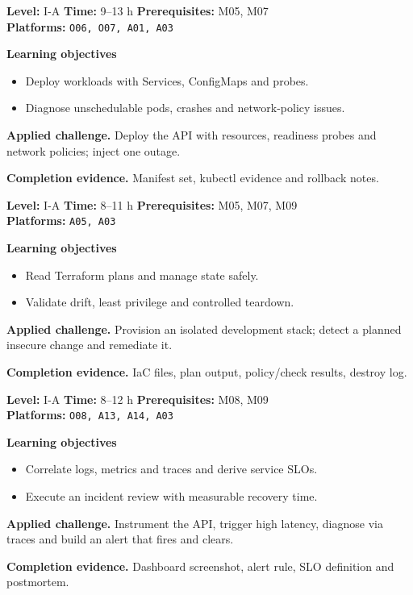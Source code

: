 \documentclass[10pt,letterpaper,oneside]{article}
\begin{document}
\vspace{2.5pt}
\begin{skillbox}[title={M09 \quad Kubernetes deployment and troubleshooting}]
\textbf{Level:} I-A \quad \textbf{Time:} 9--13 h \quad \textbf{Prerequisites:} M05, M07\\
\textbf{Platforms:} \texttt{O06, O07, A01, A03}\par
\textbf{Learning objectives}
\begin{itemize}
\item Deploy workloads with Services, ConfigMaps and probes.
\item Diagnose unschedulable pods, crashes and network-policy issues.
\end{itemize}
\textbf{Applied challenge.} Deploy the API with resources, readiness probes and network policies; inject one outage.\par
\textbf{Completion evidence.} Manifest set, kubectl evidence and rollback notes.\par
\end{skillbox}
\vspace{2.5pt}
\begin{skillbox}[title={M10 \quad Infrastructure as Code and cloud controls}]
\textbf{Level:} I-A \quad \textbf{Time:} 8--11 h \quad \textbf{Prerequisites:} M05, M07, M09\\
\textbf{Platforms:} \texttt{A05, A03}\par
\textbf{Learning objectives}
\begin{itemize}
\item Read Terraform plans and manage state safely.
\item Validate drift, least privilege and controlled teardown.
\end{itemize}
\textbf{Applied challenge.} Provision an isolated development stack; detect a planned insecure change and remediate it.\par
\textbf{Completion evidence.} IaC files, plan output, policy/check results, destroy log.\par
\end{skillbox}
\vspace{2.5pt}
\begin{skillbox}[title={M11 \quad SRE, observability and incident response}]
\textbf{Level:} I-A \quad \textbf{Time:} 8--12 h \quad \textbf{Prerequisites:} M08, M09\\
\textbf{Platforms:} \texttt{O08, A13, A14, A03}\par
\textbf{Learning objectives}
\begin{itemize}
\item Correlate logs, metrics and traces and derive service SLOs.
\item Execute an incident review with measurable recovery time.
\end{itemize}
\textbf{Applied challenge.} Instrument the API, trigger high latency, diagnose via traces and build an alert that fires and clears.\par
\textbf{Completion evidence.} Dashboard screenshot, alert rule, SLO definition and postmortem.\par
\end{skillbox}
\end{document}
